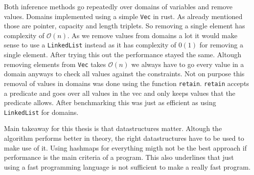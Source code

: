 Both inference methods go repeatedly over domains of variables and remove values. Domains implemented using a simple \verb|Vec| in rust. As already mentioned those are pointer, capacity and length triplets. So removing a single element has complexity of $\mathcal{O}(n)$. As we remove values from domains a lot it would make sense to use a \verb|LinkedList| instead as it has complexity of $\mathcal{0}(1)$ for removing a single element. After trying this out the performance stayed the same. Altough removing elements from \verb|Vec| takes $\mathcal{O}(n)$ we always have to go every value in a domain anyways to check all values against the constraints. Not on purpose this removal of values in domains was done using the function \verb|retain|. \verb|retain| accepts a predicate and goes over all values in the vec and only keeps values that the predicate allows. After benchmarking this was just as efficient as using \verb|LinkedList| for domains.

Main takeaway for this thesis is that datastructures matter. Altough the algorithm performs better in theory, the right datastructures have to be used to make use of it. Using hashmaps for everything migth not be the best approach if performance is the main criteria of a program. This also underlines that just using a fast programming language is not sufficient to make a really fast program.

